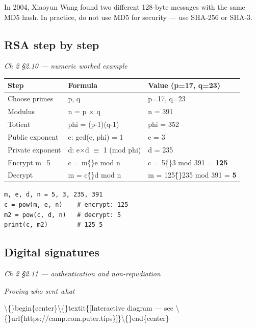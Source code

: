 \documentclass[12pt,openany]{book}
\begin{document}
In 2004, Xiaoyun Wang found two different 128-byte messages with the same MD5 hash. In practice, do not use MD5 for security --- use SHA-256 or SHA-3.

\medskip

\subsection*{RSA step by step}
{\small\itshape\color{gray}Ch 2 §2.10 --- numeric worked example}

\begin{center}\small\begin{tabular}{p{4.3cm}p{4.3cm}p{4.3cm}}\toprule
\textbf{Step} & \textbf{Formula} & \textbf{Value (p=17, q=23)} \\ \midrule
Choose primes & p, q & p=17, q=23 \\
Modulus & n = p $\times$ q & n = 391 \\
Totient & phi = (p-1)(q-1) & phi = 352 \\
Public exponent & e: gcd(e, phi) = 1 & e = 3 \\
Private exponent & d: e$\times$d $\equiv$ 1 (mod phi) & d = 235 \\
Encrypt m=5 & c = m\^\{\}e mod n & c = 5\^\{\}3 mod 391 = \textbf{125} \\
Decrypt & m = c\^\{\}d mod n & m = 125\^\{\}235 mod 391 = \textbf{5} \\
\bottomrule\end{tabular}\end{center}


\begin{lstlisting}
m, e, d, n = 5, 3, 235, 391
c = pow(m, e, n)    # encrypt: 125
m2 = pow(c, d, n)   # decrypt: 5
print(c, m2)        # 125 5\end{lstlisting}

\medskip

\subsection*{Digital signatures}
{\small\itshape\color{gray}Ch 2 §2.11 --- authentication and non-repudiation}

{\small\itshape\color{gray}Proving who sent what}

\textbackslash\{\}begin\{center\}\textbackslash\{\}textit\{[Interactive diagram --- see \textbackslash\{\}url\{https://camp.com.puter.tips\}]\}\textbackslash\{\}end\{center\}

\medskip
\end{document}
